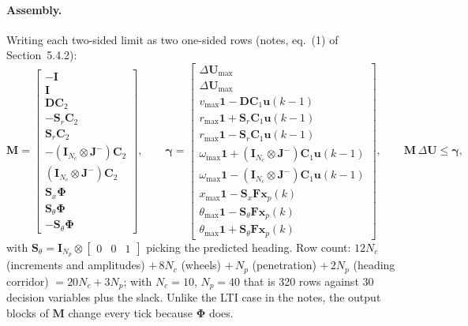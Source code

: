 \documentclass[11pt,a4paper]{article}
\newcommand{\vect}[1]{\bm{#1}}
\newcommand{\mat}[1]{\bm{#1}}
\newcommand{\dU}{\Delta\vect{U}}
\newcommand{\Np}{N_p}
\newcommand{\Nc}{N_c}
\newcommand{\ones}{\vect{1}}
\begin{document}
\paragraph{Assembly.} Writing each two-sided limit as two one-sided rows (notes, eq.~(1) of Section~5.4.2):
\begin{equation}
\mat M = \begin{bmatrix}
-\mat I\\ \mat I\\
\mat D\mat C_2\\ -\mat S_r\mat C_2\\ \mat S_r\mat C_2\\
-(\mat I_{\Nc}\otimes\mat J^{-})\mat C_2\\ (\mat I_{\Nc}\otimes\mat J^{-})\mat C_2\\
\mat S_x\mat\Phi\\ \mat S_\theta\mat\Phi\\ -\mat S_\theta\mat\Phi
\end{bmatrix},
\qquad
\vect\gamma = \begin{bmatrix}
\dU_{\max}\\ \dU_{\max}\\
v_{\max}\ones-\mat D\mat C_1\vect u(k-1)\\ r_{\max}\ones+\mat S_r\mat C_1\vect u(k-1)\\ r_{\max}\ones-\mat S_r\mat C_1\vect u(k-1)\\
\omega_{\max}\ones+(\mat I_{\Nc}\otimes\mat J^{-})\mat C_1\vect u(k-1)\\
\omega_{\max}\ones-(\mat I_{\Nc}\otimes\mat J^{-})\mat C_1\vect u(k-1)\\
x_{\max}\ones-\mat S_x\mat F\vect x_p(k)\\
\theta_{\max}\ones-\mat S_\theta\mat F\vect x_p(k)\\
\theta_{\max}\ones+\mat S_\theta\mat F\vect x_p(k)
\end{bmatrix},
\qquad
\mat M\,\dU\le\vect\gamma ,
\label{eq:Mgamma}
\end{equation}
with $\mat S_\theta=\mat I_{\Np}\otimes\begin{bmatrix}0&0&1\end{bmatrix}$ picking the predicted heading.
Row count: $12\Nc$ (increments and amplitudes) $+\,8\Nc$ (wheels) $+\,\Np$ (penetration) $+\,2\Np$ (heading corridor) $=20\Nc+3\Np$; with $\Nc=10$, $\Np=40$ that is 320 rows against 30 decision variables plus the slack. Unlike the LTI case in the notes, the output blocks of $\mat M$ change every tick because $\mat\Phi$ does.
\end{document}
